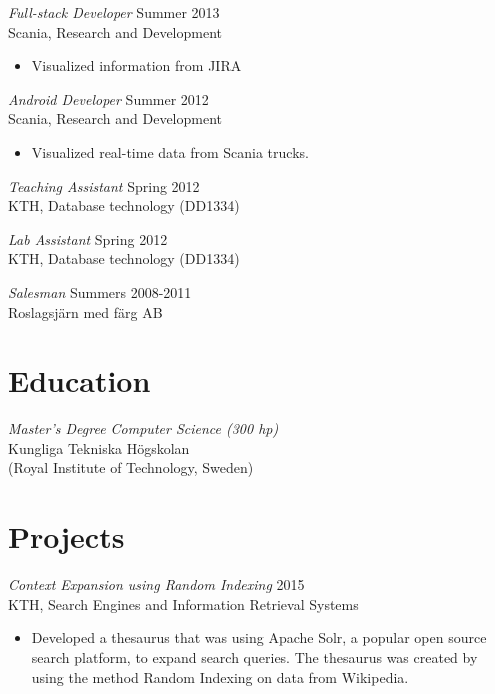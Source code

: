 \documentclass[margin, 10pt]{res} %
\begin{document}
\begin{resume}
{\sl Full-stack Developer} \hfill Summer 2013 \\
Scania, Research and Development
\begin{itemize} \itemsep -2pt %
\item Visualized information from JIRA
\end{itemize}	
 
{\sl Android Developer} \hfill Summer 2012 \\
Scania, Research and Development
\begin{itemize} 
\item Visualized real-time data from Scania trucks.
\end{itemize} 

{\sl Teaching Assistant} \hfill Spring 2012 \\
KTH, Database technology (DD1334)

{\sl Lab Assistant} \hfill Spring 2012 \\
KTH, Database technology (DD1334)

{\sl Salesman} \hfill Summers 2008-2011 \\
Roslagsjärn med färg AB



\section{Education}

{\sl Master's Degree Computer Science (300 hp)} \\
Kungliga Tekniska Högskolan \\
(Royal Institute of Technology, Sweden)

 

\section{Projects}

{\sl Context Expansion using Random Indexing} \hfill 2015 \\
KTH, Search Engines and Information Retrieval Systems
\begin{itemize} 
\item Developed a thesaurus that was using Apache Solr, a popular open source search platform, to expand search queries. The thesaurus was created by using the method Random Indexing on data from Wikipedia.
\end{itemize} 


\end{resume}
\end{document}
